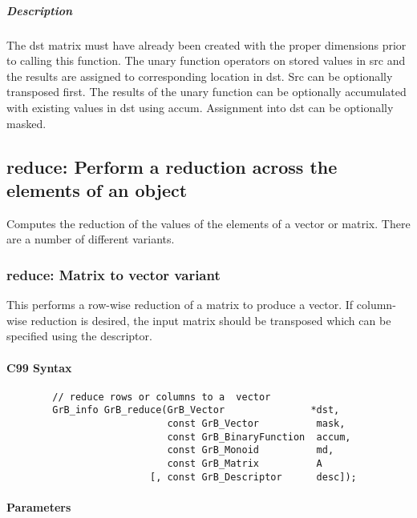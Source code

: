 \subparagraph{Description}

The dst matrix must have already been created with the proper dimensions
prior to calling this function.  The unary function operators on stored values in src and the results are assigned to corresponding location in dst.
Src can be optionally transposed first.  The results of the unary function can be optionally accumulated with existing values in dst using accum.  Assignment into dst can be optionally masked.


\subsection{{\sf reduce}: Perform a reduction across the elements of an object}

Computes the reduction of the values of the elements of a vector or matrix.  There are a number of different variants.

\subsubsection{{\sf reduce}: Matrix to vector variant}

This performs a row-wise reduction of a matrix to produce a vector.  If column-wise reduction
is desired, the input matrix should be transposed which can be specified using the descriptor.

\paragraph{C99 Syntax}

\begin{verbatim}
        // reduce rows or columns to a  vector
        GrB_info GrB_reduce(GrB_Vector               *dst,
                            const GrB_Vector          mask,
                            const GrB_BinaryFunction  accum,
                            const GrB_Monoid          md,  
                            const GrB_Matrix          A
                         [, const GrB_Descriptor      desc]);
\end{verbatim}

\paragraph{Parameters}

